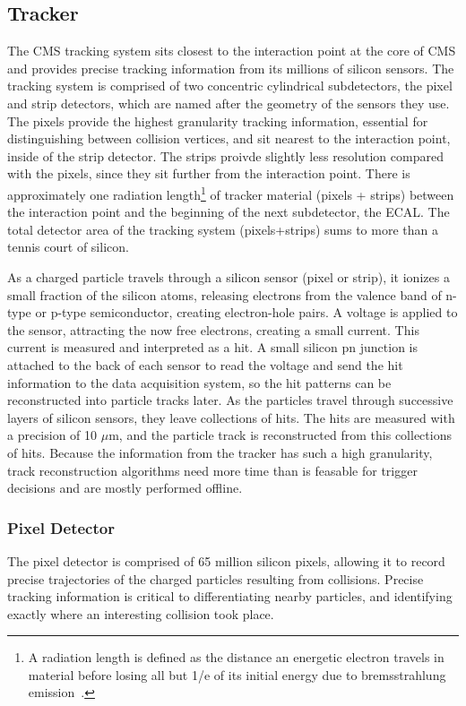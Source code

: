 \subsection{Tracker}
The CMS tracking system sits closest to the interaction point at the core of CMS and provides precise tracking information from its millions of silicon sensors.
The tracking system is comprised of two concentric cylindrical subdetectors, the pixel and strip detectors, which are named after the geometry of the sensors they use. 
The pixels provide the highest granularity tracking information, essential for distinguishing between collision vertices, and sit nearest to the interaction point,
inside of the strip detector.
The strips proivde slightly less resolution compared with the pixels, since they sit further from the interaction point. There is approximately one
radiation length\footnote{A radiation length is defined as the distance an energetic electron travels in material before losing all but 1/e of its
initial energy due to bremsstrahlung emission~\cite{radiation_length}.}
of tracker material (pixels + strips) between the interaction point and the beginning of the next subdetector, the ECAL.
The total detector area of the tracking system (pixels+strips) sums to more than a tennis court of silicon.

As a charged particle travels through a silicon sensor (pixel or strip), it ionizes a small fraction of the silicon atoms, releasing electrons from the valence band of n-type or p-type
semiconductor,
creating electron-hole pairs. A voltage is applied to the sensor, attracting the now free electrons, creating a small current. This current is measured and interpreted as a hit.
A small silicon pn junction is attached to the back of each sensor to read the voltage and send the hit information to the data acquisition system,
so the hit patterns can be reconstructed into particle tracks later.   
As the particles travel through successive layers of silicon sensors, they leave collections of hits.
The hits are measured with a precision of 10 $\mu$m, and the particle track is reconstructed from this collections of hits. 
Because the information from the tracker has such a high granularity, track reconstruction algorithms need more time than is feasable for trigger decisions
and are mostly performed offline.


\subsubsection{Pixel Detector}
The pixel detector is comprised of 65 million silicon pixels, allowing it to record
precise trajectories of the charged particles resulting from collisions. Precise tracking information is critical to differentiating nearby particles, and identifying
exactly where an interesting collision took place. 

